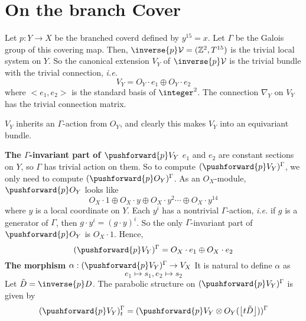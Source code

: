 \documentclass{article}
\DeclarePairedDelimiter\floor{\lfloor}{\rfloor}
\begin{document}
\section{On the branch Cover}
Let $p : Y \rightarrow X$ be the branched coverd defined by $y^{15} = x$. 
Let $\Gamma$ be the Galois group of this covering map.
Then, $\inverse{p}\V = (\mathbb{Z}^2, T^{15})$ is the trivial local system on $Y$.
So the canonical extension $V_Y$ of $\inverse{p}\V$ is the trivial bundle with the trivial 
connection, \emph{i.e.}
\[
    V_Y = O_Y\cdot e_1 \oplus O_Y\cdot e_2
\]
where $<e_1, e_2>$ is the standard basis of $\integer^2$. The connection $\nabla_Y$ on $V_Y$
has the trivial connection matrix.

$V_Y$ inherits an $\Gamma$-action from $O_Y$, and clearly this makes $V_Y$ into an equivariant
bundle. 

\textbf{The $\Gamma$-invariant part of $\pushforward{p}V_Y$}\newline
$e_1$ and $e_2$ are constant sections on $Y$, so $\Gamma$ has trivial action on them.
So to compute $(\pushforward{p}V_Y)^{\Gamma}$, we only need to compute 
$(\pushforward{p}O_Y)^{\Gamma}$. As an $O_X$-module, $\pushforward{p}O_Y$ looks like
\[
    O_X\cdot 1 \oplus O_X\cdot y \oplus O_X\cdot y^2 \cdots \oplus O_X\cdot y^{14}
\]
where $y$ is a local coordinate on $Y$. Each $y^i$ has a nontrivial $\Gamma$-action,
\emph{i.e.} if $g$ is a generator of $\Gamma$, then $g\cdot y^i = (g\cdot y)^i$.
So the only $\Gamma$-invariant part of $\pushforward{p}O_Y$ is $O_X\cdot 1$. Hence,
\[
    (\pushforward{p}V_Y)^{\Gamma} = O_X\cdot e_1 \oplus O_X\cdot e_2
\]
\newcommand{\invariant}{(\pushforward{p}V_Y)^{\Gamma}}
\textbf{The morphism $\alpha: \invariant \rightarrow V_X$}\newline
It is natural to define $\alpha$ as
\[
    e_1 \mapsto s_1, e_2 \mapsto s_2
\]
\newcommand{\tD}{\tilde{D}} 
Let $\tD = \inverse{p}D$. The parabolic structure on $\invariant$ is given by
\[
    \invariant_t = (\pushforward{p} V_Y\otimes O_Y(\floor*{t\tD}))^{\Gamma}
\]

    

  
\end{document}
